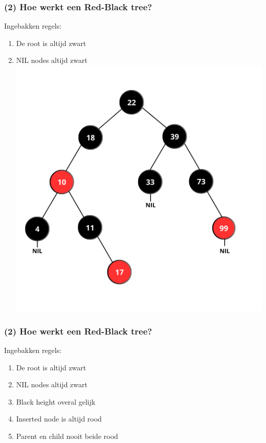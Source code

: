 \documentclass[aspectratio=169,sidebar,dyslexic]{uva-inf-presentation}
\begin{document}
\begin{frame}
\frametitle{(2) Hoe werkt een Red-Black tree?}
Ingebakken regels: \\
\begin{enumerate}
    \item De root is altijd zwart
    \pause
    \item NIL nodes altijd zwart \\
    \includegraphics[scale=.20]{DONE.png}
\end{enumerate}
\end{frame}

\begin{frame}
\frametitle{(2) Hoe werkt een Red-Black tree?}
Ingebakken regels: \\
\begin{enumerate}
    \item De root is altijd zwart
    \item NIL nodes altijd zwart
    \item Black height overal gelijk
    \pause
    \item Inserted node is altijd rood
    \pause
    \item Parent en child nooit beide rood
\end{enumerate}
\end{frame}
\end{document}
